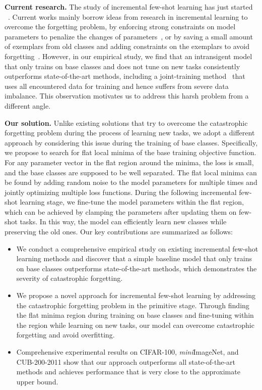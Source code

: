 \documentclass{article}
\begin{document}
\textbf{Current research.} The study of incremental few-shot learning has just started
 ~\citep{TOPIC, ren2019incremental, zhao2006mgsvf,cheraghian2021semantic,IDLVQC, FSLL,zhang2021few}. Current works mainly borrow ideas from research in incremental learning to overcome the  forgetting problem, by enforcing strong constraints on model parameters to penalize the changes of parameters~\citep{FSLL,kirkpatrick2017overcoming,zenke2017continual}, or by saving a small amount of exemplars from old classes and adding constraints on the exemplars to avoid forgetting~\citep{icarl,NCM,castro2018end}. However, in our empirical study, we find that an intransigent model that only trains on base classes and does not tune on new tasks consistently outperforms state-of-the-art methods, including a joint-training method~\citep{TOPIC} that uses all encountered data for training and hence suffers from severe data imbalance. This observation motivates us to address this harsh problem from a different angle.

\textbf{Our solution.} Unlike existing solutions that try to overcome the catastrophic forgetting problem during the process of learning new tasks, we adopt a different approach by considering this issue during the training of base classes. Specifically, we propose to search for flat local minima of the base training objective function. For any parameter vector in the flat region around the minima, the loss is small, and the base classes are supposed to be well separated. The flat local minima can be found by adding random noise to the model parameters for multiple times and jointly optimizing multiple loss functions. During the following incremental few-shot learning stage, we fine-tune the model parameters within the flat region, which can be achieved by clamping the parameters after updating them on few-shot tasks. In this way, the model can efficiently learn new classes while preserving the old ones. Our key contributions are summarized as follows:


\begin{itemize}

\item We conduct a comprehensive empirical study on existing incremental few-shot learning methods and discover that a simple baseline model that only trains on base classes outperforms state-of-the-art methods, which demonstrates the severity of catastrophic forgetting.

\item We propose a novel approach for incremental few-shot learning by addressing the catastrophic forgetting problem in the primitive stage. Through finding the flat minima region during training on base classes and fine-tuning within the region while learning on new tasks, our model can overcome catastrophic forgetting and avoid overfitting.

\item Comprehensive experimental results on CIFAR-100, \emph{mini}ImageNet, and CUB-200-2011 show that our approach outperforms all state-of-the-art methods and achieves performance that is very close to the approximate upper bound.
\end{itemize} 
\end{document}
